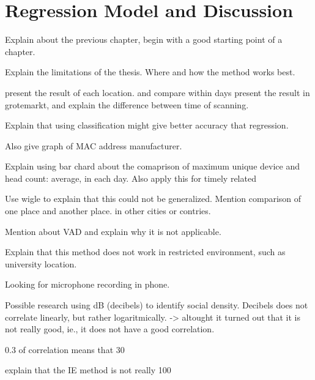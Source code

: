 \chapter{Regression Model and Discussion}
\label{ch:model-and-discussion} %
Explain about the previous chapter, begin with a good starting point of a chapter.

Explain the limitations of the thesis. Where and how the method works best.

present the result of each location. and compare within days
present the result in grotemarkt, and explain the difference between time of scanning.

Explain that using classification might give better accuracy that regression.

Also give graph of MAC address manufacturer.

Explain using bar chard about the comaprison of maximum unique device and head count: average, in each day. Also apply this for timely related 

Use wigle to explain that this could not be generalized. Mention comparison of one place and another place. in other cities or contries.

Mention about VAD and explain why it is not applicable.

Explain that this method does not work in restricted environment, such as university location.

Looking for microphone recording in phone.

Possible research using dB (decibels) to identify social density.
Decibels does not correlate linearly, but rather logaritmically. -> altought it turned out that it is not really good, ie., it does not have a good correlation.

0.3 of correlation means that 30%

explain that the IE method is not really 100%

